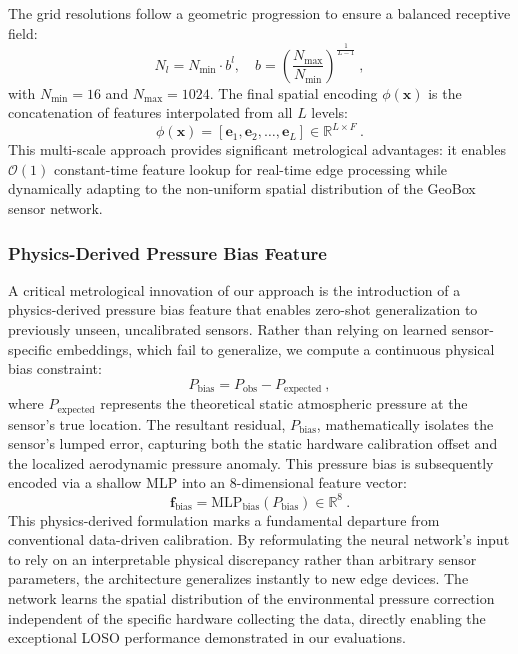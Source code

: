 The grid resolutions follow a geometric progression to ensure a balanced receptive field:
\begin{equation}
N_l = N_{\text{min}} \cdot b^l, \quad b = \left(\frac{N_{\text{max}}}{N_{\text{min}}}\right)^{\frac{1}{L-1}} \ ,
\label{eq:resolution}
\end{equation}
with $N_{\text{min}} = 16$ and $N_{\text{max}} = 1024$. The final spatial encoding $\phi(\mathbf{x})$ is the concatenation of features interpolated from all $L$ levels:
\begin{equation}
\phi(\mathbf{x}) = [\mathbf{e}_1, \mathbf{e}_2, \dots, \mathbf{e}_L] \in \mathbb{R}^{L \times F} \ .
\label{eq:concat_encoding}
\end{equation}
This multi-scale approach provides significant metrological advantages: it enables $\mathcal{O}(1)$ constant-time feature lookup for real-time edge processing while dynamically adapting to the non-uniform spatial distribution of the GeoBox sensor network.


\subsubsection{Physics-Derived Pressure Bias Feature}
\label{subsec:bias_feature}

A critical metrological innovation of our approach is the introduction of a physics-derived pressure bias feature that enables zero-shot generalization to previously unseen, uncalibrated sensors. Rather than relying on learned sensor-specific embeddings, which fail to generalize, we compute a continuous physical bias constraint:
\begin{equation}
P_{\text{bias}} = P_{\text{obs}} - P_{\text{expected}} \ ,
\label{eq:pressure_bias}
\end{equation}
where $P_{\text{expected}}$ represents the theoretical static atmospheric pressure at the sensor's true location. The resultant residual, $P_{\text{bias}}$, mathematically isolates the sensor's lumped error, capturing both the static hardware calibration offset and the localized aerodynamic pressure anomaly. This pressure bias is subsequently encoded via a shallow MLP into an 8-dimensional feature vector:
\begin{equation}
\mathbf{f}_{\text{bias}} = \text{MLP}_{\text{bias}}(P_{\text{bias}}) \in \mathbb{R}^8 \ .
\label{eq:bias_encoding}
\end{equation}
This physics-derived formulation marks a fundamental departure from conventional data-driven calibration. By reformulating the neural network's input to rely on an interpretable physical discrepancy rather than arbitrary sensor parameters, the architecture generalizes instantly to new edge devices. The network learns the spatial distribution of the environmental pressure correction independent of the specific hardware collecting the data, directly enabling the exceptional LOSO performance demonstrated in our evaluations.

